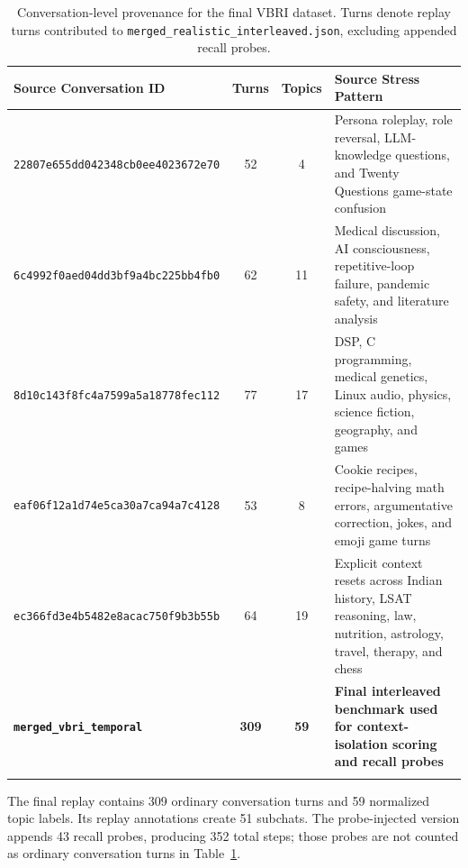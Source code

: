 \begin{table}[htbp]
\caption{Conversation-level provenance for the final VBRI dataset. Turns denote replay turns contributed to \texttt{merged\_realistic\_interleaved.json}, excluding appended recall probes.}\label{tab:scenarios}
\centering
\scriptsize
\setlength{\tabcolsep}{4pt}
\begin{tabular*}{\textwidth}{@{\extracolsep\fill}p{3.2cm}ccp{6.0cm}@{}}
\toprule
\textbf{Source Conversation ID} & \textbf{Turns} & \textbf{Topics} & \textbf{Source Stress Pattern} \\
\midrule
\texttt{22807e655dd04}\newline\texttt{2348cb0ee402}\newline\texttt{3672e70} & 52 & 4 & Persona roleplay, role reversal, LLM-knowledge questions, and Twenty Questions game-state confusion \\
\texttt{6c4992f0aed04}\newline\texttt{dd3bf9a4bc225}\newline\texttt{bb4fb0} & 62 & 11 & Medical discussion, AI consciousness, repetitive-loop failure, pandemic safety, and literature analysis \\
\texttt{8d10c143f8fc4}\newline\texttt{a7599a5a1877}\newline\texttt{8fec112} & 77 & 17 & DSP, C programming, medical genetics, Linux audio, physics, science fiction, geography, and games \\
\texttt{eaf06f12a1d74}\newline\texttt{e5ca30a7ca94}\newline\texttt{a7c4128} & 53 & 8 & Cookie recipes, recipe-halving math errors, argumentative correction, jokes, and emoji game turns \\
\texttt{ec366fd3e4b54}\newline\texttt{82e8acac750f}\newline\texttt{9b3b55b} & 64 & 19 & Explicit context resets across Indian history, LSAT reasoning, law, nutrition, astrology, travel, therapy, and chess \\
\midrule
\textbf{\texttt{merged\_vbri\_temporal}} & \textbf{309} & \textbf{59} & \textbf{Final interleaved benchmark used for context-isolation scoring and recall probes} \\
\botrule
\end{tabular*}
\end{table}

The final replay contains 309 ordinary conversation turns and 59 normalized topic labels. Its replay annotations create 51 subchats. The probe-injected version appends 43 recall probes, producing 352 total steps; those probes are not counted as ordinary conversation turns in Table~\ref{tab:scenarios}.

